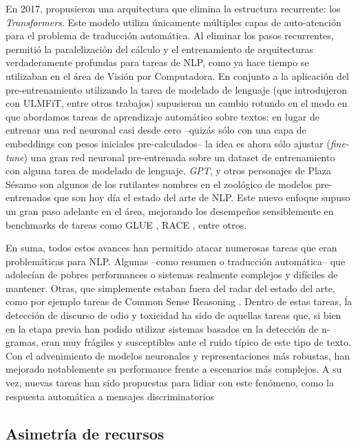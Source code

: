 En 2017, \citet{vaswani2017attention} propusieron una arquitectura que elimina la estructura recurrente: los \emph{Transformers}. Este modelo utiliza únicamente múltiples capas de auto-atención para el problema de traducción automática. Al eliminar los pasos recurrentes, permitió la paralelización del cálculo y el entrenamiento de arquitecturas verdaderamente profundas para tareas de NLP, como ya hace tiempo se utilizaban en el área de Visión por Computadora. En conjunto a la aplicación del pre-entrenamiento utilizando la tarea de modelado de lenguaje (que introdujeron \citet{howard-ruder-2018-universal} con ULMFiT, entre otros trabajos) supusieron un cambio rotundo en el modo en que abordamos tareas de aprendizaje automático sobre textos: en lugar de entrenar una red neuronal casi desde cero --quizás sólo con una capa de embeddings con pesos iniciales pre-calculados-- la idea es ahora sólo ajustar (\emph{fine-tune}) una gran red neuronal pre-entrenada sobre un dataset de entrenamiento con alguna tarea de modelado de lenguaje. \emph{GPT}, \bert{} y otros personajes de Plaza Sésamo son algunos de los rutilantes nombres en el zoológico de modelos pre-entrenados que son hoy día el estado del arte de NLP. Este nuevo enfoque supuso un gran paso adelante en el área, mejorando los desempeños sensiblemente en benchmarks de tareas como GLUE \cite{wang-etal-2018-glue}, RACE \cite{lai2017race}, entre otros.

En suma, todos estos avances han permitido atacar numerosas tareas que eran problemáticas para NLP. Algunas --como resumen o traducción automática-- que adolecían de pobres performances o sistemas realmente complejos y difíciles de mantener. Otras, que simplemente estaban fuera del radar del estado del arte, como por ejemplo tareas de Common Sense Reasoning . Dentro de estas tareas, ĺa detección de discurso de odio y toxicidad ha sido de aquellas tareas que, si bien en la etapa previa han podido utilizar sistemas basados en la detección de n-gramas, eran muy frágiles y susceptibles ante el ruido típico de este tipo de texto. Con el advenimiento de modelos neuronales y representaciones más robustas, han mejorado notablemente su performance frente a escenarios más complejos. A su vez, nuevas tareas han sido propuestas para lidiar con este fenómeno, como la respuesta automática a mensajes discriminatorios   

\subsection{Asimetría de recursos}

